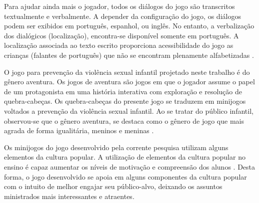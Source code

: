 
Para ajudar ainda mais o jogador, todos os diálogos do jogo são transcritos textualmente e verbalmente. A depender da configuração do jogo, os diálogos podem ser exibidos em português, espanhol, ou inglês. No entanto, a verbalização dos dialógicos (localização), encontra-se disponível somente em português. A localização associada ao texto escrito proporciona acessibilidade do jogo as crianças (falantes de português) que não se encontram plenamente alfabetizadas \cite{limeira2015avaliaccao}. 

O jogo para prevenção da violência sexual infantil projetado neste trabalho é do gênero aventura. Os jogos de aventura são jogos em que o jogador assume o papel de um protagonista em uma história interativa com exploração e resolução de quebra-cabeças. Os quebra-cabeças do presente jogo se traduzem em minijogos voltados a prevenção da violência sexual infantil. Ao se tratar do público infantil, observou-se que o gênero aventura, se destaca como o gênero de jogo que mais agrada de forma igualitária, meninos e meninas \cite{brandtzaeg2009children}. 

Os minijogos do jogo desenvolvido pela corrente pesquisa utilizam alguns elementos da cultura popular. A utilização de elementos da cultura popular no ensino é capaz aumentar os níveis de motivação e compreensão dos alunos \cite{giroux1988schooling, cheung2001use, duncan2004your, chik2011learner}. Desta forma, o jogo desenvolvido se apoia em alguns componentes da cultura popular com o intuito de melhor engajar seu público-alvo, deixando os assuntos ministrados mais interessantes e atraentes. 

